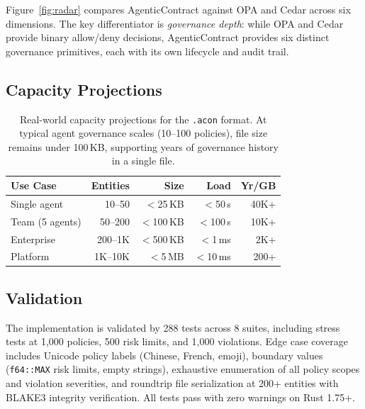 \documentclass[10pt, twocolumn]{article}
\begin{document}
Figure~\ref{fig:radar} compares AgenticContract against OPA and Cedar across six dimensions. The key differentiator is \emph{governance depth}: while OPA and Cedar provide binary allow/deny decisions, AgenticContract provides six distinct governance primitives, each with its own lifecycle and audit trail.

\subsection{Capacity Projections}

\begin{table}[t]
\caption{Real-world capacity projections for the \texttt{.acon} format. At typical agent governance scales (10--100 policies), file size remains under 100\,KB, supporting years of governance history in a single file.}
\label{tab:capacity}
\centering
\scriptsize
\setlength{\tabcolsep}{4pt}
\begin{tabular}{@{}lrrrr@{}}
\toprule
\textbf{Use Case} & \textbf{Entities} & \textbf{Size} & \textbf{Load} & \textbf{Yr/GB} \\
\midrule
Single agent & 10--50 & $<$25\,KB & $<$50\,\textmu{}s & 40K+ \\
Team (5 agents) & 50--200 & $<$100\,KB & $<$100\,\textmu{}s & 10K+ \\
Enterprise & 200--1K & $<$500\,KB & $<$1\,ms & 2K+ \\
Platform & 1K--10K & $<$5\,MB & $<$10\,ms & 200+ \\
\bottomrule
\end{tabular}
\end{table}

\subsection{Validation}

The implementation is validated by 288 tests across 8 suites, including stress tests at 1{,}000 policies, 500 risk limits, and 1{,}000 violations. Edge case coverage includes Unicode policy labels (Chinese, French, emoji), boundary values (\texttt{f64::MAX} risk limits, empty strings), exhaustive enumeration of all policy scopes and violation severities, and roundtrip file serialization at 200+ entities with BLAKE3 integrity verification. All tests pass with zero warnings on Rust 1.75+.

\end{document}
